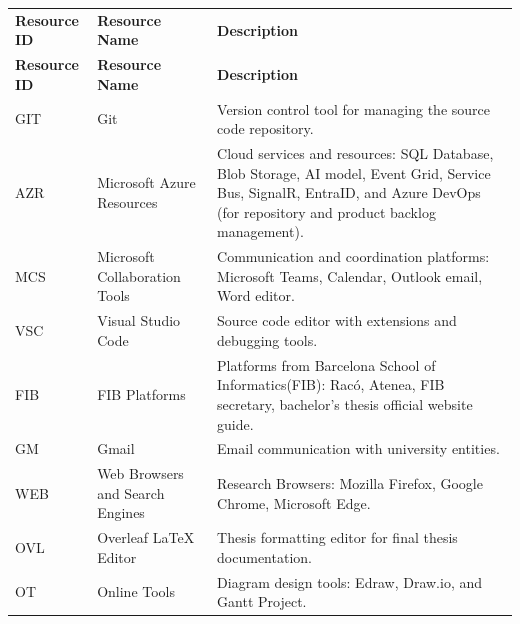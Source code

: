 \begin{tabularx}{\linewidth}{|>{\centering\arraybackslash}p{2.5cm}|>{\raggedright\arraybackslash}p{3cm}|>{\raggedright\arraybackslash}X|}

\hline
\rowcolor{cyan!80}
\multicolumn{3}{|c|}{\textbf{Software Resources}} \\ \hline
\rowcolor{cyan!40}
\textbf{Resource ID} & \textbf{Resource Name} & \textbf{Description} \\ \hline
\endfirsthead %

\hline
\rowcolor{cyan!40}
\textbf{Resource ID} & \textbf{Resource Name} & \textbf{Description} \\ \hline
\endhead

GIT & Git & Version control tool for managing the source code repository. \\ \hline
AZR & Microsoft Azure Resources & Cloud services and resources: SQL Database, Blob Storage, AI model, Event Grid, Service Bus, SignalR, EntraID, and Azure DevOps (for repository and product backlog management). \\ \hline
MCS & Microsoft Collaboration Tools & Communication and coordination platforms: Microsoft Teams, Calendar, Outlook email, Word editor. \\ \hline
VSC & Visual Studio Code & Source code editor with extensions and debugging tools. \\ \hline
FIB & FIB Platforms & Platforms from Barcelona School of Informatics(FIB): Racó, Atenea, FIB secretary, bachelor’s thesis official website guide. \\ \hline
GM & Gmail & Email communication with university entities. \\ \hline
WEB & Web Browsers and Search Engines & Research Browsers: Mozilla Firefox, Google Chrome, Microsoft Edge. \\ \hline
OVL & Overleaf LaTeX Editor & Thesis formatting editor for final thesis documentation. \\ \hline
OT & Online Tools & Diagram design tools: Edraw, Draw.io, and Gantt Project. \\ \hline

\end{tabularx}
